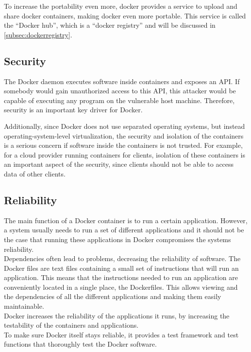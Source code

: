 To increase the portability even more, docker provides a service to upload and share docker containers, making docker even more portable. This service is called the ``Docker hub'', which is a ``docker registry'' and will be discussed in \ref{subsec:dockerregistry}.

\subsection{Security}
The Docker daemon executes software inside containers and exposes an API. If somebody would gain unauthorized access to this API, this attacker would be capable of executing any program on the vulnerable host machine. Therefore, security is an important key driver for Docker. 

Additionally, since Docker does not use separated operating systems, but instead operating-system-level virtualization, the security and isolation of the containers is a serious concern if software inside the containers is not trusted. For example, for a cloud provider running containers for clients, isolation of these containers is an important aspect of the security, since clients should not be able to access data of other clients.


\subsection{Reliability}
The main function of a Docker container is to run a certain application. However, a system usually needs to run a set of different applications and it should not be the case that running these applications in Docker compromises the systems reliability.\\
Dependencies often lead to problems\cite{dockerrepo}, decreasing the reliability of software. The Docker files are text files containing a small set of instructions that will run an application. This means that the instructions needed to run an application are conveniently located in a single place, the Dockerfiles. This  allows viewing and the dependencies of all the different applications and making them easily maintainable.\\
Docker increases the reliability of the applications it runs, by increasing the testability of the containers and applications.\\
To make sure Docker itself stays reliable, it provides a test framework and test functions that thoroughly test the Docker software. \cite{dockertest}\\
%

